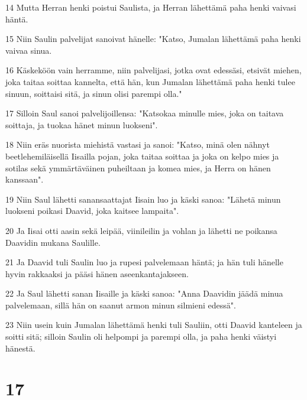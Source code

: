 \par 14 Mutta Herran henki poistui Saulista, ja Herran lähettämä paha henki vaivasi häntä.
\par 15 Niin Saulin palvelijat sanoivat hänelle: "Katso, Jumalan lähettämä paha henki vaivaa sinua.
\par 16 Käskeköön vain herramme, niin palvelijasi, jotka ovat edessäsi, etsivät miehen, joka taitaa soittaa kannelta, että hän, kun Jumalan lähettämä paha henki tulee sinuun, soittaisi sitä, ja sinun olisi parempi olla."
\par 17 Silloin Saul sanoi palvelijoillensa: "Katsokaa minulle mies, joka on taitava soittaja, ja tuokaa hänet minun luokseni".
\par 18 Niin eräs nuorista miehistä vastasi ja sanoi: "Katso, minä olen nähnyt beetlehemiläisellä Iisailla pojan, joka taitaa soittaa ja joka on kelpo mies ja sotilas sekä ymmärtäväinen puheiltaan ja komea mies, ja Herra on hänen kanssaan".
\par 19 Niin Saul lähetti sanansaattajat Iisain luo ja käski sanoa: "Lähetä minun luokseni poikasi Daavid, joka kaitsee lampaita".
\par 20 Ja Iisai otti aasin sekä leipää, viinileilin ja vohlan ja lähetti ne poikansa Daavidin mukana Saulille.
\par 21 Ja Daavid tuli Saulin luo ja rupesi palvelemaan häntä; ja hän tuli hänelle hyvin rakkaaksi ja pääsi hänen aseenkantajakseen.
\par 22 Ja Saul lähetti sanan Iisaille ja käski sanoa: "Anna Daavidin jäädä minua palvelemaan, sillä hän on saanut armon minun silmieni edessä".
\par 23 Niin usein kuin Jumalan lähettämä henki tuli Sauliin, otti Daavid kanteleen ja soitti sitä; silloin Saulin oli helpompi ja parempi olla, ja paha henki väistyi hänestä.

\chapter{17}

